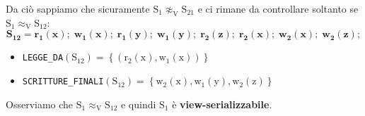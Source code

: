 {  Da ciò sappiamo che sicuramente \( \mathrm{S_1 \not\approx_V S_{21}} \) e ci rimane da controllare soltanto se \( \mathrm{S_1 \approx_V S_{12}} \):
  \[
    \mathbf{S_{12} = r_1(x); \; w_1(x); \; r_1(y); \; w_1(y); \; r_2(z); \; r_2(x); \; w_2(x); \;
    w_2(z)};
  \]
  \begin{itemize}
    \item \texttt{LEGGE\_DA}\( \mathrm{(S_{12})} = \left\{ \mathrm{(r_2(x), w_1(x))} \right\} \)
    \item \texttt{SCRITTURE\_FINALI}\( \mathrm{(S_{12})} = \left\{ \mathrm{w_2(x), w_1(y), w_2(z)} \right\} \)
  \end{itemize}

  \smallskip
  Osserviamo che \( \mathrm{S_1 \approx_V S_{12}} \) e quindi \( \mathrm{S_1} \) è \textbf{view-serializzabile}.
}

